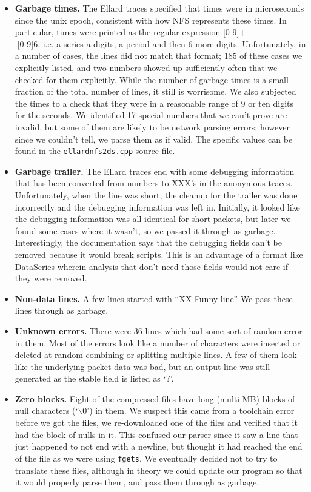 \documentclass{article}
\begin{document}
\begin{itemize}
\item {\bf Garbage times.} The Ellard traces specified that times were
in microseconds since the unix epoch, consistent with how NFS
represents these times.  In particular, times were printed as the
regular expression [0-9]+\\.[0-9]{6}, i.e. a series a digits, a period
and then 6 more digits.  Unfortunately, in a number of cases, the
lines did not match that format; 185 of these cases we explicitly
listed, and two numbers showed up sufficiently often that we checked
for them explicitly.  While the number of garbage times is a small
fraction of the total number of lines, it still is worrisome.  We also
subjected the times to a check that they were in a reasonable range of
9 or ten digits for the seconds.  We identified 17 special numbers
that we can't prove are invalid, but some of them are likely to be
network parsing errors; however since we couldn't tell, we parse them
as if valid.  The specific values can be found in the
\texttt{ellardnfs2ds.cpp} source file.

\item {\bf Garbage trailer.}  The Ellard traces end with some
debugging information that has been converted from numbers to XXX's in
the anonymous traces.  Unfortunately, when the line was short, the
cleanup for the trailer was done incorrectly and the debugging
information was left in.  Initially, it looked like the debugging
information was all identical for short packets, but later we found
some cases where it wasn't, so we passed it through as garbage.
Interestingly, the documentation says that the debugging fields can't
be removed because it would break scripts.  This is an advantage of a
format like DataSeries wherein analysis that don't need those fields
would not care if they were removed.

\item {\bf Non-data lines.}  A few lines started with ``XX Funny
line'' We pass these lines through as garbage.

\item {\bf Unknown errors.} There were 36 lines which had some sort of
random error in them.  Most of the errors look like a number of
characters were inserted or deleted at random combining or splitting
multiple lines.  A few of them look like the underlying packet data
was bad, but an output line was still generated as the stable field is
listed as `?'.

\item {\bf Zero blocks.} Eight of the compressed files have long
(multi-MB) blocks of null characters (`$\backslash0$') in them.  We
suspect this came from a toolchain error before we got the files, we
re-downloaded one of the files and verified that it had the block of
nulls in it.  This confused our parser since it saw a line that just
happened to not end with a newline, but thought it had reached the end
of the file as we were using \texttt{fgets}.  We eventually decided
not to try to translate these files, although in theory we could
update our program so that it would properly parse them, and pass them
through as garbage.


\end{itemize}
\end{document}
